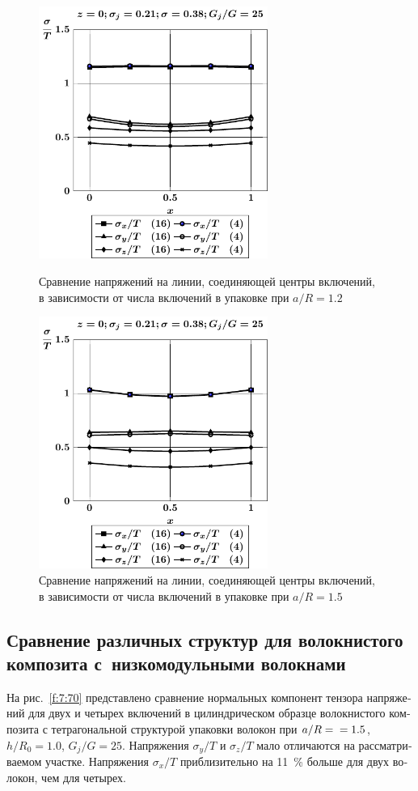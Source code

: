 \begin{russian}
\begin{figure}[h!]
\centering\footnotesize
\parbox[b]{7.5cm}{\centering\includegraphics[width=7.5cm]{inc16-4-a12-h10-r10-g25-z0.pdf}
\caption{Сравнение напряжений на линии, соединяющей центры включений, в зависимости от числа включений в упаковке при $a/R=1.2$ 
\label{fig:10}}}\hfil\hfil
\parbox[b]{7.5cm}{\centering\includegraphics[width=7.5cm]{inc16-4-a15-h10-r10-g25-z0.pdf}
\caption{Сравнение напряжений на линии, соединяющей центры включений, в зависимости от числа включений в упаковке при $a/R=1.5$
\label{fig:11}
}}
\end{figure}

\subsection{Сравнение различных структур для волокнистого композита с~низкомодульными волокнами}

На рис.~\ref{f:7:70} представлено сравнение нормальных компонент тензора напряжений для двух и четырех включений в цилиндрическом образце волокнистого композита с тетрагональной структурой упаковки волокон при $a/R=\\=1.5$, $h/R_0=1.0$, $G_j/G=25$. Напряжения $\sigma_y/T$ и $\sigma_z/T$ мало отличаются на рассматриваемом участке. Напряжения $\sigma_x/T$ приблизительно на 11~\% больше для двух волокон, чем для четырех.\sloppy


\end{russian}
